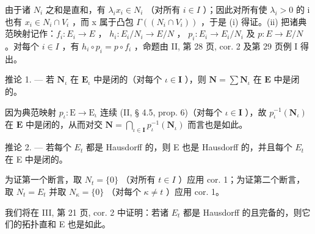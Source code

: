由于诸 \(N_{i}\) 之和是直和，有 \(\lambda_{i}x_{i} \in N_{i}\) （对所有 \(i \in I\) ）；因此对所有使 \(\lambda_{i} > 0\) 的 i 也有 \(x_{i} \in N_{i} \cap V_{i}\) ，而 x 属于凸包 \(\Gamma((N_{i} \cap V_{i}))\) ，于是 (i) 得证。(ii) 把诸典范映射记作：\(f_{i}: E_{i} \to E\) ， \(h_{i}: E_{i}/N_{i} \to E/N\) ， \(p_{i}: E_{i} \to E_{i}/N_{i}\) 及 \(p: E \to E/N\) 。对每个 \(i \in I\) ，有 \(h_{i} \circ p_{i} = p \circ f_{i}\) ，命题由 II, 第 28 页, cor. 2 及第 29 页例 I 得出。

推论 1. --- 若 \(\mathbf{N}_{\iota}\) 在 \(\mathbf{E}_{\iota}\) 中是闭的（对每个 \(\iota \in \mathbf{I}\) ），则 \(\mathbf{N} = \sum \mathbf{N}_{\iota}\) 在 \(\mathbf{E}\) 中是闭的。

因为典范映射 \(p_{\iota} : \mathrm{E} \to \mathrm{E}_{\iota}\) 连续 (II, § 4.5, prop. 6)（对每个 \(\iota \in \mathbf{I}\) ），故 \(p_{\iota}^{-1}(\mathbf{N}_{\iota})\) 在 \(\mathbf{E}\) 中是闭的，从而对交 \(\mathbf{N} = \bigcap_{\iota \in \mathbf{I}} p_{\iota}^{-1}(\mathbf{N}_{\iota})\) 而言也是如此。

推论 2. --- 若每个 \(E_{t}\) 都是 Hausdorff 的，则 E 也是 Hausdorff 的，并且每个 \(E_{t}\) 在 E 中是闭的。

为证第一个断言，取 \(N_{t} = \{0\}\) （对所有 \(t \in I\) ）应用 cor. 1；为证第二个断言，取 \(N_{t} = E_{t}\) 并取 \(N_{\kappa} = \{0\}\) （对每个 \(\kappa \neq t\) ）应用 cor. 1。

我们将在 III, 第 21 页, cor. 2 中证明：若诸 \(E_{t}\) 都是 Hausdorff 的且完备的，则它们的拓扑直和 E 也是如此。

